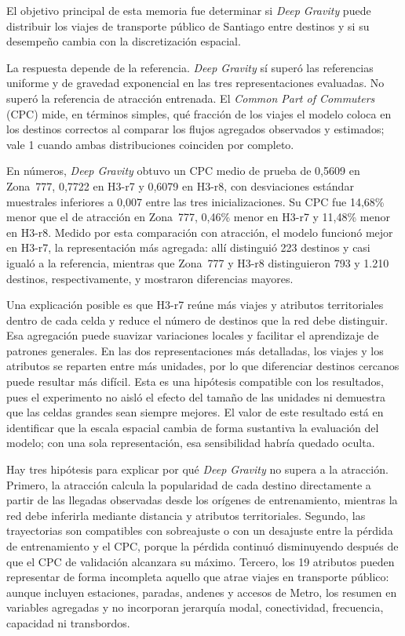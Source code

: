 \label{sec:cap6}

El objetivo principal de esta memoria fue determinar si \textit{Deep Gravity} puede distribuir los viajes de transporte público de Santiago entre destinos y si su desempeño cambia con la discretización espacial.

La respuesta depende de la referencia. \textit{Deep Gravity} sí superó las referencias uniforme y de gravedad exponencial en las tres representaciones evaluadas. No superó la referencia de atracción entrenada. El \textit{Common Part of Commuters} (CPC) mide, en términos simples, qué fracción de los viajes el modelo coloca en los destinos correctos al comparar los flujos agregados observados y estimados; vale 1 cuando ambas distribuciones coinciden por completo.

En números, \textit{Deep Gravity} obtuvo un CPC medio de prueba de 0,5609 en Zona~777, 0,7722 en H3-r7 y 0,6079 en H3-r8, con desviaciones estándar muestrales inferiores a 0,007 entre las tres inicializaciones. Su CPC fue 14,68\% menor que el de atracción en Zona~777, 0,46\% menor en H3-r7 y 11,48\% menor en H3-r8. Medido por esta comparación con atracción, el modelo funcionó mejor en H3-r7, la representación más agregada: allí distinguió 223 destinos y casi igualó a la referencia, mientras que Zona~777 y H3-r8 distinguieron 793 y 1.210 destinos, respectivamente, y mostraron diferencias mayores.

Una explicación posible es que H3-r7 reúne más viajes y atributos territoriales dentro de cada celda y reduce el número de destinos que la red debe distinguir. Esa agregación puede suavizar variaciones locales y facilitar el aprendizaje de patrones generales. En las dos representaciones más detalladas, los viajes y los atributos se reparten entre más unidades, por lo que diferenciar destinos cercanos puede resultar más difícil. Esta es una hipótesis compatible con los resultados, pues el experimento no aisló el efecto del tamaño de las unidades ni demuestra que las celdas grandes sean siempre mejores. El valor de este resultado está en identificar que la escala espacial cambia de forma sustantiva la evaluación del modelo; con una sola representación, esa sensibilidad habría quedado oculta.

Hay tres hipótesis para explicar por qué \textit{Deep Gravity} no supera a la atracción. Primero, la atracción calcula la popularidad de cada destino directamente a partir de las llegadas observadas desde los orígenes de entrenamiento, mientras la red debe inferirla mediante distancia y atributos territoriales. Segundo, las trayectorias son compatibles con sobreajuste o con un desajuste entre la pérdida de entrenamiento y el CPC, porque la pérdida continuó disminuyendo después de que el CPC de validación alcanzara su máximo. Tercero, los 19 atributos pueden representar de forma incompleta aquello que atrae viajes en transporte público: aunque incluyen estaciones, paradas, andenes y accesos de Metro, los resumen en variables agregadas y no incorporan jerarquía modal, conectividad, frecuencia, capacidad ni transbordos.

